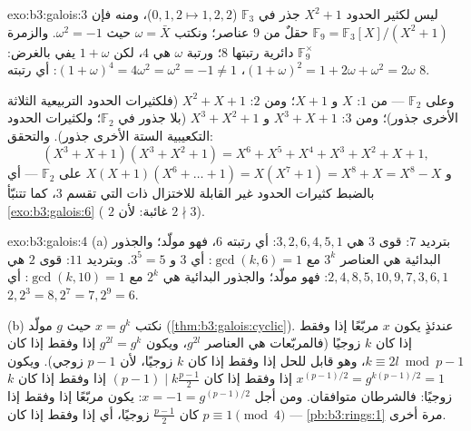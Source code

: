 \begin{solution}{exo:b3:galois:3}
ليس لكثير الحدود $X^2 + 1$ جذر في $\mathbb F_3$ ($0, 1, 2 \mapsto 1, 2,
2$)، ومنه
فإن $\mathbb F_9 = \mathbb F_3[X]/(X^2+1)$ حقلٌ من $9$ عناصر؛ ونكتب $\omega = \bar X$ حيث $\omega^2 = -1$.
والزمرة $\mathbb F_9^\times$ دائرية رتبتها $8$؛ ورتبة $\omega$ هي $4$، لكن
$1 + \omega$ يفي بالغرض: $(1+\omega)^2 = 1 + 2\omega +
\omega^2 = 2\omega$، $(1+\omega)^4 = 4\omega^2 = \omega^2 = -1
\ne 1$: أي رتبته $8$.

وعلى $\mathbb F_2$ --- من  $1$: $X$ و $X + 1$؛ ومن 
$2$: $X^2 + X + 1$ (فلكثيرات الحدود التربيعية الثلاثة الأخرى
جذور)؛ ومن  $3$: $X^3 + X + 1$ و $X^3 + X^2 + 1$ (بلا جذور
في $\mathbb
F_2$؛ ولكثيرات الحدود التكعيبية الستة الأخرى جذور).
والتحقق:
\[
(X^3{+}X{+}1)(X^3{+}X^2{+}1) = X^6 + X^5 + X^4 + X^3 + X^2 + X
+ 1,
\]
و $X(X{+}1)(X^6 + \dots + 1) = X(X^7 + 1) = X^8 + X = X^8 -
X$ على $\mathbb F_2$ --- أي بالضبط كثيرات الحدود غير
القابلة للاختزال ذات  التي تقسم $3$، كما تتنبّأ
\cref{exo:b3:galois:6} ( $2$ غائبة: لأن $2 \nmid 3$).
\end{solution}

\begin{solution}{exo:b3:galois:4}
(a) بترديد $7$: قوى $3$ هي $3, 2, 6, 4, 5, 1$: أي رتبته $6$، فهو مولّد؛
والجذور البدائية هي العناصر $3^k$ مع $\gcd(k, 6) = 1$: أي $3$
و $3^5 = 5$. وبترديد $11$: قوى $2$ هي $2, 4, 8, 5, 10, 9, 7, 3, 6, 1$: فهو مولّد؛ والجذور
البدائية هي $2^k$ مع $\gcd(k, 10) = 1$: أي $2, 2^3 = 8, 2^7 = 7, 2^9 = 6$.

(b) نكتب $x = g^k$ حيث $g$ مولّد (\cref{thm:b3:galois:cyclic}). عندئذٍ يكون $x$
مربّعًا إذا وفقط إذا كان $k$ زوجيًا (فالمربّعات هي العناصر
$g^{2l}$، ويكون $g^{2l} = g^{k}$ إذا وفقط إذا كان $k
\equiv 2l \bmod p-1$، وهو
قابل للحل إذا وفقط إذا كان $k$ زوجيًا، لأن $p - 1$ زوجي). ويكون
$x^{(p-1)/2} = g^{k(p-1)/2} = 1$ إذا وفقط إذا كان $(p-1) \mid
k\frac{p-1}2$ إذا وفقط إذا كان $k$ زوجيًا:
فالشرطان متوافقان. ومن أجل $x =
-1 = g^{(p-1)/2}$: يكون مربّعًا إذا وفقط إذا
كان $\frac{p-1}2$ زوجيًا، أي إذا وفقط إذا كان $p \equiv 1 \pmod 4$ ---
\cref{pb:b3:rings:1} مرة أخرى.
\end{solution}

